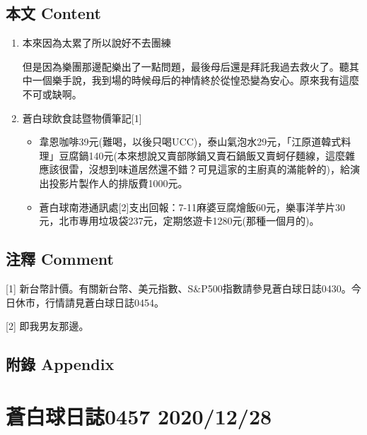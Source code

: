 \documentclass[
]{article}
\providecommand{\tightlist}{%
  \setlength{\itemsep}{0pt}\setlength{\parskip}{0pt}}
\begin{document}
\hypertarget{ux672cux6587-content-26}{%
\subsection{本文 Content}\label{ux672cux6587-content-26}}

\begin{enumerate}
\def\labelenumi{\arabic{enumi}.}
\item
  本來因為太累了所以說好不去團練

  但是因為樂團那邊配樂出了一點問題，最後母后還是拜託我過去救火了。聽其中一個樂手說，我到場的時候母后的神情終於從惶恐變為安心。原來我有這麼不可或缺啊。
\item
  蒼白球飲食誌暨物價筆記{[}1{]}

  \begin{itemize}
  \tightlist
  \item
    韋恩咖啡39元(難喝，以後只喝UCC)，泰山氣泡水29元，「江原道韓式料理」豆腐鍋140元(本來想說又賣部隊鍋又賣石鍋飯又賣蚵仔麵線，這麼雜應該很雷，沒想到味道居然還不錯？可見這家的主廚真的滿能幹的)，給演出投影片製作人的排版費1000元。
  \item
    蒼白球南港通訊處{[}2{]}支出回報：7-11麻婆豆腐燴飯60元，樂事洋芋片30元，北市專用垃圾袋237元，定期悠遊卡1280元(那種一個月的)。
  \end{itemize}
\end{enumerate}

\hypertarget{ux6ce8ux91cb-comment-26}{%
\subsection{注釋 Comment}\label{ux6ce8ux91cb-comment-26}}

{[}1{]}
新台幣計價。有關新台幣、美元指數、S\&P500指數請參見蒼白球日誌0430。今日休市，行情請見蒼白球日誌0454。

{[}2{]} 即我男友那邊。

\hypertarget{ux9644ux9304-appendix-26}{%
\subsection{附錄 Appendix}\label{ux9644ux9304-appendix-26}}

\hypertarget{ux84bcux767dux7403ux65e5ux8a8c0457-20201228}{%
\section{蒼白球日誌0457
2020/12/28}\label{ux84bcux767dux7403ux65e5ux8a8c0457-20201228}}
\end{document}
